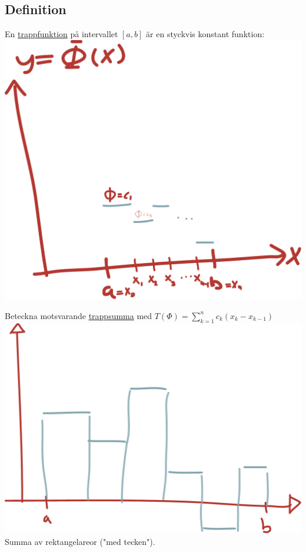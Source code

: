 \documentclass{article}
\begin{document}
\subsection{Definition}
En \uline{trappfunktion} på intervallet $[a, b]$ är en styckvis konstant funktion:\\
\includegraphics[scale=0.25]{img/img1.pdf}

Beteckna motsvarande \uline{trappsumma} med $T(\Phi)=\sum_{k=1}^n c_k (x_k-x_{k-1})$\\
\includegraphics[scale=0.25]{img/img2.pdf}\\
Summa av rektangelareor ("med tecken").
\end{document}

